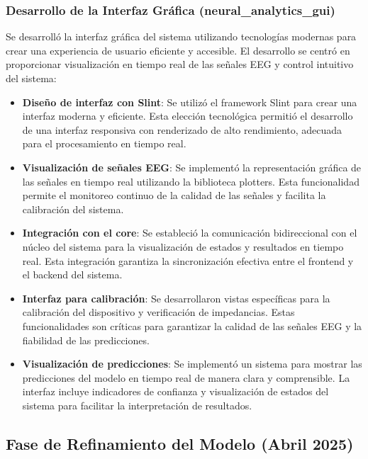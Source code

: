 \subsubsection{Desarrollo de la Interfaz Gráfica (neural\_analytics\_gui)}

Se desarrolló la interfaz gráfica del sistema utilizando tecnologías modernas para crear una experiencia de usuario eficiente y accesible. El desarrollo se centró en proporcionar visualización en tiempo real de las señales EEG y control intuitivo del sistema:

\begin{itemize}
    \item \textbf{Diseño de interfaz con Slint}: Se utilizó el framework Slint para crear una interfaz moderna y eficiente. Esta elección tecnológica permitió el desarrollo de una interfaz responsiva con renderizado de alto rendimiento, adecuada para el procesamiento en tiempo real.
    
    \item \textbf{Visualización de señales EEG}: Se implementó la representación gráfica de las señales en tiempo real utilizando la biblioteca plotters. Esta funcionalidad permite el monitoreo continuo de la calidad de las señales y facilita la calibración del sistema.
    
    \item \textbf{Integración con el core}: Se estableció la comunicación bidireccional con el núcleo del sistema para la visualización de estados y resultados en tiempo real. Esta integración garantiza la sincronización efectiva entre el frontend y el backend del sistema.
    
    \item \textbf{Interfaz para calibración}: Se desarrollaron vistas específicas para la calibración del dispositivo y verificación de impedancias. Estas funcionalidades son críticas para garantizar la calidad de las señales EEG y la fiabilidad de las predicciones.
    
    \item \textbf{Visualización de predicciones}: Se implementó un sistema para mostrar las predicciones del modelo en tiempo real de manera clara y comprensible. La interfaz incluye indicadores de confianza y visualización de estados del sistema para facilitar la interpretación de resultados.
\end{itemize}

\subsection{Fase de Refinamiento del Modelo (Abril 2025)}

